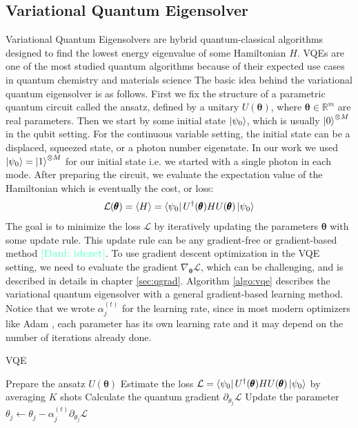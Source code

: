 \documentclass[12pt, a4paper,  nobibnotes]{article}
\newcommand{\nd}[1]{\textcolor{Aquamarine}{\textbf{[Dani: #1]}}}
\begin{document}
\subsection{Variational Quantum Eigensolver}
Variational Quantum Eigensolvers \cite{Peruzzo2014} are hybrid quantum-classical algorithms designed to find the lowest energy eigenvalue of some Hamiltonian $H$. VQEs are one of the most studied quantum algorithms because of their expected use cases in quantum chemistry and
materials science \cite{Wei2020-QCHEM,VQE-HARTREE-FOCK,Kandala2017-VQE-QCHEM,PhysRevX-VQE-QCHEM}
The basic idea behind the variational quantum eigensolver is as follows. First we fix the structure of a parametric quantum circuit called the ansatz, defined by a unitary $U(\pmb\theta)$, where $\pmb\theta\in\mathbb{R}^m$ are real parameters. Then we start by some initial state $\ket{\psi_0}$, which is usually $\ket 0^{\otimes M}$ in the qubit setting. For the continuous variable setting, the initial state can be a displaced, squeezed state, or a photon number eigenstate. In our work we used $\ket{\psi_0}=\ket{1}^{\otimes M}$ for our initial state i.e. we started with a single photon in each mode. After preparing the circuit, we evaluate the expectation value of the Hamiltonian which is eventually the cost, or loss:
\begin{equation}
    \mathcal L(\pmb\theta) = \langle H \rangle = \bra{\psi_0}U^{\dagger}(\pmb\theta)HU(\pmb\theta)\ket{\psi_0}
\end{equation}
The goal is to minimize the loss $\mathcal L$ by iteratively updating the parameters $\pmb\theta$ with some update rule. This update rule can be any gradient-free \cite{Zhu2019} or gradient-based method \nd{idezet}. To use gradient descent optimization in the VQE setting, we need to evaluate the gradient
$\nabla_{\pmb\theta}\mathcal L$, which can be challenging, and is described in details in chapter \ref{sec:qgrad}. Algorithm \ref{algo:vqe} describes 
the variational quantum eigensolver with a general gradient-based learning method. Notice that we wrote $\alpha_j^{(t)}$ for the learning rate, since in most modern optimizers like Adam \cite{Kingma2015AdamAM}, each parameter has its own learning rate and it may depend on the number of iterations already done.
\begin{algorithm}[H]
    \caption{VQE}
    \begin{algorithmic}[1]
            \State Prepare the ansatz $U(\pmb\theta)$
            \State Estimate the loss $\mathcal L = \bra{\psi_0}U^{\dagger}(\pmb\theta)HU(\pmb\theta)\ket{\psi_0}$ by averaging $K$ shots
                \State Calculate the quantum gradient $\partial_{\theta_j}\mathcal L$
                \State Update the parameter $\theta_j \leftarrow \theta_j - \alpha_j^{(t)}\partial_{\theta_j}\mathcal L$
            \EndFor
        \EndFor
    \EndProcedure
    \end{algorithmic}
    \label{algo:vqe}
\end{algorithm}
\end{document}
